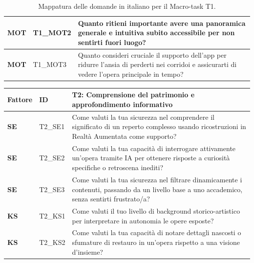 \begin{table}[H]
\begin{tabular}{
        |>{\centering\arraybackslash\bfseries}p{1.5cm}
        |>{\centering\arraybackslash}p{2.2cm}
        |>{\raggedright\arraybackslash}p{9.8cm}|
    }
        \hline
        MOT & T1\_MOT2 & Quanto ritieni importante avere una panoramica generale e intuitiva subito accessibile per non sentirti fuori luogo? \\
        \hline
        \rowcolor{culturiaBeige}
        MOT & T1\_MOT3 & Quanto consideri cruciale il supporto dell'app per ridurre l'ansia di perderti nei corridoi e assicurarti di vedere l'opera principale in tempo? \\
        \hline
    \end{tabular}
    \vspace{0.15cm}
    \caption{Mappatura delle domande in italiano per il Macro-task T1.}
    \label{tab:domande_t1_it}
\end{table}

\begin{table}[H]
    \centering
    \small
    \renewcommand{\arraystretch}{1.3}
    \begin{tabular}{
        |>{\centering\arraybackslash\bfseries}p{1.5cm}
        |>{\centering\arraybackslash}p{2.2cm}
        |>{\raggedright\arraybackslash}p{9.8cm}|
    }
        \hline
        \rowcolor{culturiaRed}
        \textcolor{culturiaWhite}{\textbf{Fattore}} &
        \textcolor{culturiaWhite}{\textbf{ID}} &
        \textcolor{culturiaWhite}{\textbf{T2: Comprensione del patrimonio e approfondimento informativo}} \\
        \hline
        \rowcolor{culturiaBeige}
        SE & T2\_SE1 & Come valuti la tua sicurezza nel comprendere il significato di un reperto complesso usando ricostruzioni in Realtà Aumentata come supporto? \\
        \hline
        SE & T2\_SE2 & Come valuti la tua capacità di interrogare attivamente un'opera tramite IA per ottenere risposte a curiosità specifiche o retroscena inediti? \\
        \hline
        \rowcolor{culturiaBeige}
        SE & T2\_SE3 & Come valuti la tua sicurezza nel filtrare dinamicamente i contenuti, passando da un livello base a uno accademico, senza sentirti frustrato/a? \\
        \hline
        KS & T2\_KS1 & Come valuti il tuo livello di background storico-artistico per interpretare in autonomia le opere esposte? \\
        \hline
        \rowcolor{culturiaBeige}
        KS & T2\_KS2 & Come valuti la tua capacità di notare dettagli nascosti o sfumature di restauro in un'opera rispetto a una visione d'insieme? \\
        \hline

\end{tabular}
\end{table}
